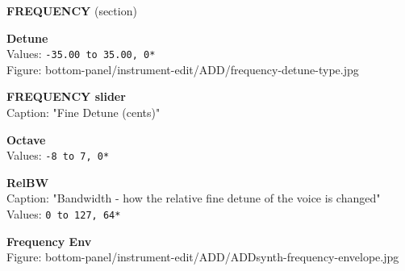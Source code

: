 \documentclass[
 11pt,
 twoside,
 a4paper,
 headinclude,
 footinclude,
 final                                 %
]{article}
\begin{document}
\begin{enumber}
\begin{enumber}
\begin{enumber}

         \item \textbf{FREQUENCY} (section)
         \begin{enumber}
            \item \textbf{Detune} \\
               Values: \texttt{-35.00 to 35.00, 0*} \\
               Figure: bottom-panel/instrument-edit/ADD/frequency-detune-type.jpg
            \item \textbf{FREQUENCY slider} \\
               Caption: "Fine Detune (cents)"
            \item \textbf{Octave} \\
               Values: \texttt{-8 to 7, 0*}
            \item \textbf{RelBW} \\
               Caption: "Bandwidth - how the relative fine detune of the voice is changed" \\
               Values: \texttt{0 to 127, 64*}


            \item \textbf{Frequency Env} \\
               Figure: bottom-panel/instrument-edit/ADD/ADDsynth-frequency-envelope.jpg


\end{enumber}
\end{enumber}
\end{enumber}
\end{enumber}
\end{document}

